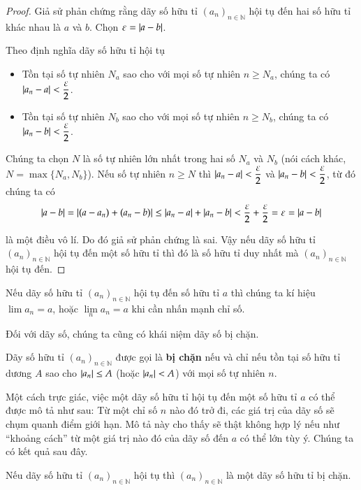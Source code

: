 \begin{proof}
    Giả sử phản chứng rằng dãy số hữu tỉ ${(a_{n})}_{n\in\mathbb{N}}$ hội tụ đến hai số hữu tỉ khác nhau là $a$ và $b$. Chọn $\varepsilon = \left\vert{a - b}\right\vert$.

    Theo định nghĩa dãy số hữu tỉ hội tụ
    \begin{itemize}[topsep=0pt]
        \item Tồn tại số tự nhiên $N_{a}$ sao cho với mọi số tự nhiên $n\geq N_{a}$, chúng ta có $\left\vert{a_{n} - a}\right\vert < \dfrac{\varepsilon}{2}$.
        \item Tồn tại số tự nhiên $N_{b}$ sao cho với mọi số tự nhiên $n\geq N_{b}$, chúng ta có $\left\vert{a_{n} - b}\right\vert < \dfrac{\varepsilon}{2}$.
    \end{itemize}

    Chúng ta chọn $N$ là số tự nhiên lớn nhất trong hai số $N_{a}$ và $N_{b}$ (nói cách khác, $N = \max\{ N_{a}, N_{b} \}$). Nếu số tự nhiên $n\geq N$ thì $\left\vert{a_{n} - a}\right\vert < \dfrac{\varepsilon}{2}$ và $\left\vert{a_{n} - b}\right\vert < \dfrac{\varepsilon}{2}$, từ đó chúng ta có
    \[
        \left\vert{a - b}\right\vert = \left\vert{(a - a_{n}) + (a_{n} - b)}\right\vert \leq \left\vert{a_{n} - a}\right\vert + \left\vert{a_{n} - b}\right\vert < \frac{\varepsilon}{2} + \frac{\varepsilon}{2} = \varepsilon = \left\vert{a - b}\right\vert
    \]

    là một điều vô lí. Do đó giả sử phản chứng là sai. Vậy nếu dãy số hữu tỉ ${(a_{n})}_{n\in\mathbb{N}}$ hội tụ đến một số hữu tỉ thì đó là số hữu tỉ duy nhất mà ${(a_{n})}_{n\in\mathbb{N}}$ hội tụ đến.
\end{proof}

Nếu dãy số hữu tỉ ${(a_{n})}_{n\in\mathbb{N}}$ hội tụ đến số hữu tỉ $a$ thì chúng ta kí hiệu $\lim a_{n} = a$, hoặc $\lim\limits_{n} a_{n} = a$ khi cần nhấn mạnh chỉ số.

Đối với dãy số, chúng ta cũng có khái niệm dãy số bị chặn.
\begin{definition}
    Dãy số hữu tỉ ${(a_{n})}_{n\in\mathbb{N}}$ được gọi là \textbf{bị chặn} nếu và chỉ nếu tồn tại số hữu tỉ dương $A$ sao cho $\left\vert{a_{n}}\right\vert\leq A$ (hoặc $\left\vert{a_{n}}\right\vert < A$) với mọi số tự nhiên $n$.
\end{definition}

Một cách trực giác, việc một dãy số hữu tỉ hội tụ đến một số hữu tỉ $a$ có thể được mô tả như sau: Từ một chỉ số $n$ nào đó trở đi, các giá trị của dãy số sẽ chụm quanh điểm giới hạn. Mô tả này cho thấy sẽ thật không hợp lý nếu như ``khoảng cách'' từ một giá trị nào đó của dãy số đến $a$ có thể lớn tùy ý. Chúng ta có kết quả sau đây.
\begin{appendixthm}\label{appendixthm:convergence-sequences-are-bounded}
    Nếu dãy số hữu tỉ ${(a_{n})}_{n\in\mathbb{N}}$ hội tụ thì ${(a_{n})}_{n\in\mathbb{N}}$ là một dãy số hữu tỉ bị chặn.
\end{appendixthm}

